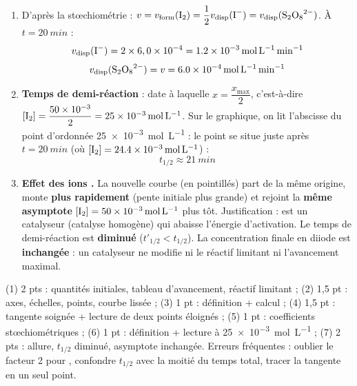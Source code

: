 \documentclass[11pt]{article}
\begin{document}
\begin{corrige}
\begin{enumerate}
\[ v_{\text{inst}}(\ce{I2})_{20} = \frac{(36,4 - 12,4)\times 10^{-3}}{40 - 0} = \frac{24,0\times 10^{-3}}{40} = \SI{6,0e-4}{mol.L^{-1}.min^{-1}} \]
\textbf{Comparaison :} $v_{\text{inst}}(20\ \text{min}) < v_{\text{moy}}(10 \to 30\ \text{min})$. La vitesse instantanée diminue au cours du temps (la courbe s'aplatit) car les réactifs s'épuisent ; la vitesse moyenne sur $[10;30]$ intègre des vitesses plus grandes au début de l'intervalle, d'où une valeur supérieure à la vitesse au milieu de l'intervalle.
\item D'après la stœchiométrie : $v = v_{\text{form}}(\ce{I2}) = \dfrac{1}{2}v_{\text{disp}}(\ce{I-}) = v_{\text{disp}}(\ce{S2O8^2-})$. À $t = \SI{20}{min}$ :
\[ v_{\text{disp}}(\ce{I-}) = 2 \times 6,0\times 10^{-4} = \SI{1,2e-3}{mol.L^{-1}.min^{-1}} \]
\[ v_{\text{disp}}(\ce{S2O8^2-}) = v = \SI{6,0e-4}{mol.L^{-1}.min^{-1}} \]
\item \textbf{Temps de demi-réaction} : date à laquelle $x = \dfrac{x_{\max}}{2}$, c'est-à-dire $[\ce{I2}] = \dfrac{50\times 10^{-3}}{2} = \SI{25e-3}{mol.L^{-1}}$. Sur le graphique, on lit l'abscisse du point d'ordonnée \SI{25e-3}{mol.L^{-1}} : le point se situe juste après $t = \SI{20}{min}$ (où $[\ce{I2}] = \SI{24,4e-3}{mol.L^{-1}}$) :
\[ t_{1/2} \approx \SI{21}{min} \]
\item \textbf{Effet des ions .} La nouvelle courbe (en pointillés) part de la même origine, monte \textbf{plus rapidement} (pente initiale plus grande) et rejoint la \textbf{même asymptote} $[\ce{I2}] = \SI{50e-3}{mol.L^{-1}}$ plus tôt. Justification :  est un catalyseur (catalyse homogène) qui abaisse l'énergie d'activation. Le temps de demi-réaction est \textbf{diminué} ($t'_{1/2} < t_{1/2}$). La concentration finale en diiode est \textbf{inchangée} : un catalyseur ne modifie ni le réactif limitant ni l'avancement maximal.
\end{enumerate}
\end{corrige}

\begin{attention}
(1) 2 pts : quantités initiales, tableau d'avancement, réactif limitant ; (2) 1,5 pt : axes, échelles, points, courbe lissée ; (3) 1 pt : définition + calcul ; (4) 1,5 pt : tangente soignée + lecture de deux points éloignés ; (5) 1 pt : coefficients stœchiométriques ; (6) 1 pt : définition + lecture à \SI{25e-3}{mol.L^{-1}} ; (7) 2 pts : allure, $t_{1/2}$ diminué, asymptote inchangée. Erreurs fréquentes : oublier le facteur 2 pour , confondre $t_{1/2}$ avec la moitié du temps total, tracer la tangente en un seul point.
\end{attention}
\end{document}
